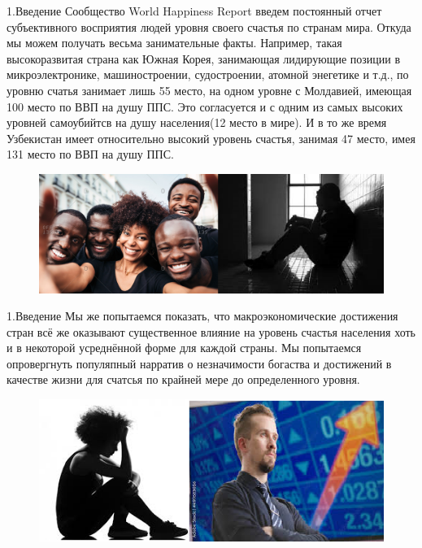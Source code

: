 \documentclass[aspectratio=169]{beamer}
\begin{document}
\begin{frame}{1.Введение}
   Сообщество World Happiness Report введем постоянный отчет субъективного восприятия людей уровня своего счастья по странам мира. Откуда мы можем получать весьма занимательные факты. Например, такая высокоразвитая страна как Южная Корея, занимающая лидирующие позиции в микроэлектронике, машиностроении, судостроении, атомной энегетике и т.д., по уровню счатья занимает лишь 55 место, на одном уровне с Молдавией, имеющая 100 место по ВВП на душу ППС. Это согласуется и с одним из самых высоких уровней самоубийтсв на душу населения(12 место в мире). И в то же время Узбекистан имеет относительно высокий уровень счастья, занимая 47 место, имея 131 место по ВВП на душу ППС. 
   
   \begin{figure} \label{hompic}
            \centering
            \includegraphics[scale=0.32]{Union1.png}
    \end{figure}

\end{frame}

\begin{frame}{1.Введение}
   Мы же попытаемся показать, что макроэкономические достижения стран всё же оказывают существенное влияние на уровень счастья населения хоть и в некоторой усреднённой форме для каждой страны. Мы попытаемся опровергнуть популяпный нарратив о незначимости богаства и достижений в качестве жизни для счатсья по крайней мере до определенного уровня.  
   \begin{figure} \label{hompic}
            \centering
            \includegraphics[scale=1]{Union2.png}
    \end{figure}
\end{frame}
\end{document}
